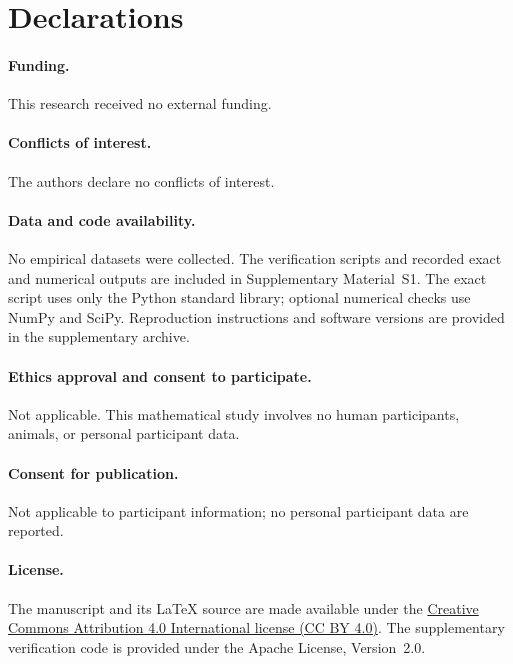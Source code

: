 \documentclass[11pt]{article}
\theoremstyle{remark}
\begin{document}
\section*{Declarations}
\paragraph{Funding.} This research received no external funding.
\paragraph{Conflicts of interest.} The authors declare no conflicts of interest.
\paragraph{Data and code availability.}
No empirical datasets were collected. The verification scripts and recorded
exact and numerical outputs are included in Supplementary Material~S1.
The exact script uses only the Python standard library; optional numerical
checks use NumPy and SciPy. Reproduction instructions and software versions
are provided in the supplementary archive.
\paragraph{Ethics approval and consent to participate.}
Not applicable. This mathematical study involves no human participants,
animals, or personal participant data.
\paragraph{Consent for publication.}
Not applicable to participant information; no personal participant data
are reported.
\paragraph{License.}
The manuscript and its LaTeX source are made available under the
\href{https://creativecommons.org/licenses/by/4.0/}{Creative Commons
Attribution 4.0 International license (CC BY 4.0)}. The supplementary
verification code is provided under the Apache License, Version~2.0.
\end{document}
